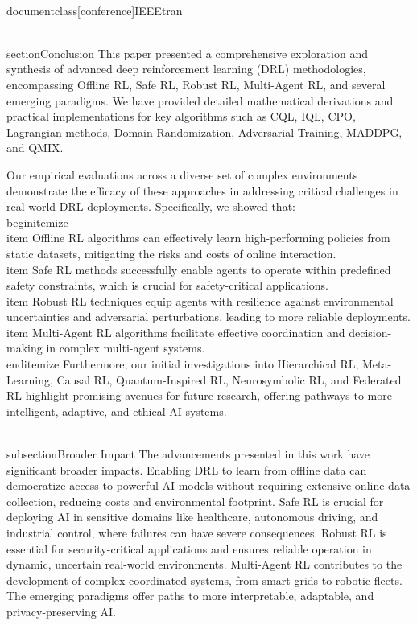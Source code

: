 \\documentclass[conference]{IEEEtran}
\begin{document}
\\section{Conclusion}
This paper presented a comprehensive exploration and synthesis of advanced deep reinforcement learning (DRL) methodologies, encompassing Offline RL, Safe RL, Robust RL, Multi-Agent RL, and several emerging paradigms. We have provided detailed mathematical derivations and practical implementations for key algorithms such as CQL, IQL, CPO, Lagrangian methods, Domain Randomization, Adversarial Training, MADDPG, and QMIX.

Our empirical evaluations across a diverse set of complex environments demonstrate the efficacy of these approaches in addressing critical challenges in real-world DRL deployments. Specifically, we showed that:
\\begin{itemize}
    \\item Offline RL algorithms can effectively learn high-performing policies from static datasets, mitigating the risks and costs of online interaction.
    \\item Safe RL methods successfully enable agents to operate within predefined safety constraints, which is crucial for safety-critical applications.
    \\item Robust RL techniques equip agents with resilience against environmental uncertainties and adversarial perturbations, leading to more reliable deployments.
    \\item Multi-Agent RL algorithms facilitate effective coordination and decision-making in complex multi-agent systems.
\\end{itemize}
Furthermore, our initial investigations into Hierarchical RL, Meta-Learning, Causal RL, Quantum-Inspired RL, Neurosymbolic RL, and Federated RL highlight promising avenues for future research, offering pathways to more intelligent, adaptive, and ethical AI systems.

\\subsection{Broader Impact}
The advancements presented in this work have significant broader impacts. Enabling DRL to learn from offline data can democratize access to powerful AI models without requiring extensive online data collection, reducing costs and environmental footprint. Safe RL is crucial for deploying AI in sensitive domains like healthcare, autonomous driving, and industrial control, where failures can have severe consequences. Robust RL is essential for security-critical applications and ensures reliable operation in dynamic, uncertain real-world environments. Multi-Agent RL contributes to the development of complex coordinated systems, from smart grids to robotic fleets. The emerging paradigms offer paths to more interpretable, adaptable, and privacy-preserving AI.
\end{document}
